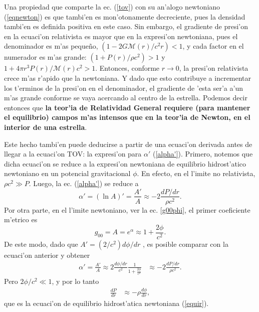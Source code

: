 Una propiedad que comparte la ec. (\ref{tov}) con su an'alogo newtoniano (\ref{eqnewton}) es que tambi'en es mon'otonamente decreciente, pues la densidad tambi'en  es definida positiva en este caso. Sin embargo, el gradiente de presi'on en la ecuaci'on relativista es mayor que en la expresi'on newtoniana, pues el denominador es m'as peque\~no, $\left(1-{2G\mathcal{M}(r)}/{c^2r}\right)<1$, y cada factor en el numerador es m'as grande:  $\left(1+{P(r)}/{\rho c^2}\right)>1$ y $1+{4\pi r^3P(r)}/{\mathcal{M}(r)c^2}>1$. Entonces, conforme $r\to0$, la presi'on relativista crece m'as r'apido que la newtoniana. Y dado que esto contribuye a incrementar los t'erminos de la presi'on en el denominador, el gradiente de 'esta ser'a a'un m'as grande conforme se vaya acercando al centro de la estrella. Podemos decir entonces que \textbf{la teor'ia de Relatividad General requiere (para mantener el equilibrio) campos m'as intensos que en la teor'ia de Newton, en el interior de una estrella}.

Este hecho tambi'en puede deducirse a partir de una ecuaci'on derivada antes de llegar a la ecuaci'on TOV: la expresi'on para $\alpha'$ (\ref{alpha'}). Primero, notemos que dicha ecuaci'on se reduce a la expresi'on newtoniana de equilibrio hidrost'atico newtoniano en un potencial gravitacional $\phi$. En efecto, en el l'imite no relativista, $\rho c^2\gg P$. Luego, la ec. (\ref{alpha'}) se reduce a
\begin{equation}
 \alpha'=(\ln A)'=\frac{A'}{A}\approx-2\frac{dP/dr}{\rho c^2}.
\end{equation}
Por otra parte, en el l'imite newtoniano, ver la ec. \eqref{g00phi}, el primer coeficiente m'etrico es
\begin{equation}
g_{00}=A=e^{\alpha}\approx1+\frac{2\phi}{c^2}.
\end{equation}
De este modo, dado que $A'=(2/c^2)d\phi/dr$ , es posible comparar con la ecuaci'on anterior y obtener
\begin{align*}
\alpha'=\frac{A'}{A}\approx2 \frac{d\phi/dr}{c^2}\frac{1}{1+\frac{2\phi}{c^2}}&\approx-2\frac{dP/dr}{\rho c^2}.
\end{align*}
Pero $2\phi/c^2\ll 1$, y por lo tanto
\begin{align*}
\frac{dP}{dr}&\approx-\rho\frac{d\phi}{dr},
\end{align*}
que es la ecuaci'on de equilibrio hidrost'atica newtoniana (\ref{equir}).

